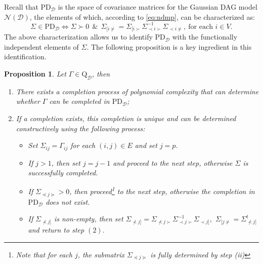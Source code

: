 \documentclass[12pt]{article}
\newcommand{\D}{\mathcal{D}}
\theoremstyle{plain}
\newtheorem{proposition}[theorem]{Proposition}
\theoremstyle{definition}
\theoremstyle{remark}
\begin{document}
Recall that $\mathrm{PD}_{\D}$  is the space of covariance matrices for the Gaussian DAG model $\mathscr{N}(\D)$, the elements of which, according to \eqref{eq:ndmp}, can be characterized as:
\begin{equation}\label{eq:sigma}
\Sigma\in \mathrm{PD}_{\D}\Longleftrightarrow  \Sigma\succ 0\: \: \& \:\: \Sigma_{[i\nsucc}=\Sigma_{[i\succ}\Sigma_{\prec i\succ}^{-1}\Sigma_{\prec i\nsucc},\: \text{for each $i\in V$}. 
\end{equation}
%
%
The above characterization allows us to identify $\mathrm{PD}_{\D}$ with the functionally independent elements of $\Sigma$. The following proposition is a key ingredient in this identification. 
%
\begin{proposition}\cite{benraj12}\label{prop:completion_in_PDD}
Let $\Gamma\in\mathrm{Q}_{\D}$, then
\begin{enumerate}
\item There exists a completion process of polynomial complexity that can determine whether $\Gamma$ can be completed in $\mathrm{PD}_{\D}$;
\item If a completion exists, this completion is unique and can be determined constructively using the following process:
\begin{itemize}
\renewcommand{\labelitemi}{$i)$}
\item Set $\Sigma_{ij}=\Gamma_{ij}$ \; for each $(i,j)\in E$  and set  $j=p$.
\renewcommand{\labelitemi}{$ii)$}
\item If  $j>1$, then set $j=j-1$ and proceed to the next step, otherwise $\Sigma$ is successfully completed.
\renewcommand{\labelitemi}{$iii)$}
\item If $\Sigma_{\preceq j\succeq}> 0$, then proceed\footnote{Note that for each $j$, the submatrix $\Sigma_{\preceq j\succeq}$ is fully determined by step {\it(ii)}} to the next step, otherwise the completion in $\mathrm{PD}_{\D}$  does not exist.
\renewcommand{\labelitemi}{$iv)$}
\item If $\Sigma_{\nprec j]}$ is non-empty, then set $\Sigma_{\nprec j]}=\Sigma_{\nprec j\succ}\Sigma_{\prec j\succ}^{-1}\Sigma_{\prec j]},$ $\Sigma_{[ j\nsucc}=\Sigma_{\nprec j ]}^{t}$ and return to step $(2).$
\end{itemize}
\end{enumerate}
\end{proposition}
\end{document}
